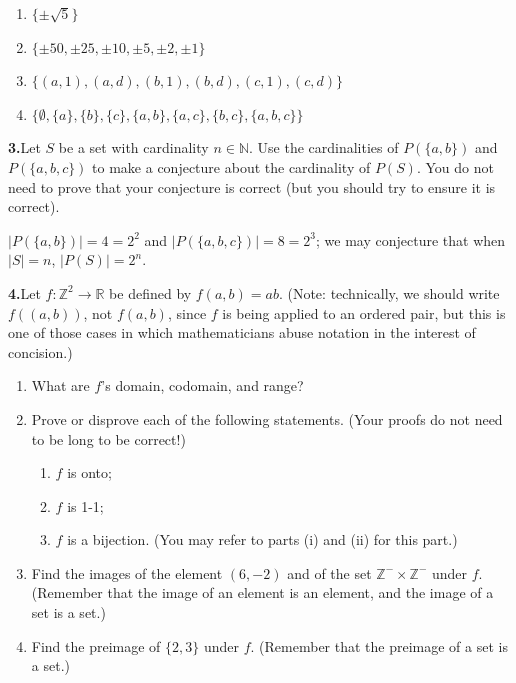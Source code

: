 \documentclass[10pt,]{book}
\theoremstyle{plain}
\theoremstyle{definition}
\theoremstyle{definition}
\theoremstyle{definition}
\theoremstyle{definition}
\numberwithin{equation}{section}
\def\Z{\mathbb{Z}}
\def\R{\mathbb{R}}
\def\N{\mathbb{N}}
\begin{document}
%
\par\smallskip
\leavevmode%
\begin{enumerate}[label=(\alph*)]
\item\hypertarget{li-35}{}\(\{\pm\sqrt{5}\}\)%
\item\hypertarget{li-36}{}\(\{\pm 50, \pm 25, \pm 10, \pm 5, \pm 2, \pm 1\}\)%
\item\hypertarget{li-37}{}\(\{(a,1),(a,d), (b,1),(b,d),(c,1),(c,d)\}\)%
\item\hypertarget{li-38}{}\(\{\emptyset, \{a\}, \{b\},
\{c\},\{a,b\},\{a,c\},\{b,c\}, \{a,b,c\}\}\)%
\end{enumerate}
\par\smallskip
\noindent\textbf{3.}\quad{}Let \(S\) be a set with cardinality \(n\in \N\). Use the cardinalities of \(P(\{a,b\})\) and \(P(\{a,b,c\})\) to make a conjecture about the cardinality of \(P(S)\). You do not need to prove that your conjecture is correct (but you should try to ensure it is correct).%
\par\smallskip
\(|P(\{a,b\})|=4=2^2\) and \(|P(\{a,b,c\})|=8=2^3\); we may conjecture that when \(|S|=n\), \(|P(S)|=2^n\).%
\par\smallskip
\noindent\textbf{4.}\quad{}Let \(f: \Z^2 \to \R\) be defined by \(f(a,b)=ab\). (Note: technically, we should write \(f((a,b))\), not \(f(a,b)\), since \(f\) is being applied to an ordered pair, but this is one of those cases in which mathematicians abuse notation in the interest of concision.)%
\leavevmode%
\begin{enumerate}[label=(\alph*)]
\item\hypertarget{li-39}{}What are \(f\)'s domain, codomain, and range?%
\item\hypertarget{li-40}{}Prove or disprove each of the following statements. (Your proofs do not need to be long to be correct!)%
%
\begin{enumerate}[label=\roman*.]
\item\hypertarget{li-41}{}\(f\) is onto;%
\item\hypertarget{li-42}{}\(f\) is 1-1;%
\item\hypertarget{li-43}{}\(f\) is a bijection. (You may refer to parts (i) and (ii) for this part.)%
\end{enumerate}
\item\hypertarget{li-44}{}Find the images of the element \((6,-2)\) and of the set \(\Z^- \times \Z^-\) under \(f\). (Remember that the image of an element is an element, and the image of a set is a set.)%
\item\hypertarget{li-45}{}Find the preimage of \(\{2,3\}\) under \(f\). (Remember that the preimage of a set is a set.)%
\end{enumerate}
\end{document}
